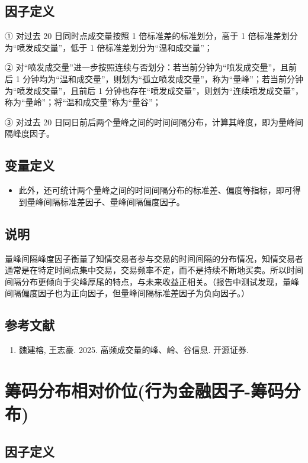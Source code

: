\documentclass{article}
\begin{document}
\subsection{因子定义}

① 对过去 20 日同时点成交量按照 1 倍标准差的标准划分，高于 1 倍标准差划分为“喷发成交量”，低于 1 倍标准差划分为“温和成交量”；

② 对“喷发成交量”进一步按照连续与否划分：若当前分钟为“喷发成交量”，且前后 1 分钟均为“温和成交量”，则划为“孤立喷发成交量”，称为“量峰”；若当前分钟为“喷发成交量”，且前后 1 分钟也存在“喷发成交量”，则划为“连续喷发成交量”，称为“量岭”；将“温和成交量”称为“量谷”；

③ 对过去 20 日同日前后两个量峰之间的时间间隔分布，计算其峰度，即为量峰间隔峰度因子。

\subsection{变量定义}
\begin{itemize}
    \item 此外，还可统计两个量峰之间的时间间隔分布的标准差、偏度等指标，即可得到量峰间隔标准差因子、量峰间隔偏度因子。
\end{itemize}

\subsection{说明}
量峰间隔峰度因子衡量了知情交易者参与交易的时间间隔的分布情况，知情交易者通常是在特定时间点集中交易，交易频率不定，而不是持续不断地买卖。所以时间间隔分布更倾向于尖峰厚尾的特点，与未来收益正相关。（报告中测试发现，量峰间隔偏度因子也为正向因子，但量峰间隔标准差因子为负向因子。）

\subsection{参考文献}
\begin{enumerate}
    \item 魏建榕, 王志豪. 2025. 高频成交量的峰、岭、谷信息. 开源证券.
\end{enumerate}

\section{筹码分布相对价位(行为金融因子-筹码分布)}

\subsection{因子定义}
\end{document}
